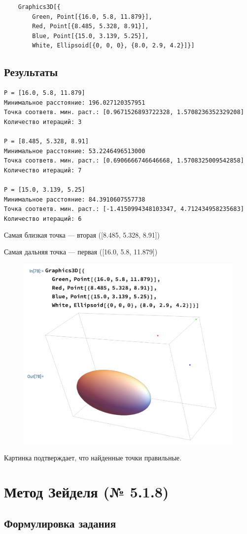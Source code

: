 \documentclass[a4paper,11pt]{article}
\theoremstyle{definition} %
\theoremstyle{remark} %
\begin{document}
\begin{verbatim}
    Graphics3D[{
        Green, Point[{16.0, 5.8, 11.879}],
        Red, Point[{8.485, 5.328, 8.91}], 
        Blue, Point[{15.0, 3.139, 5.25}], 
        White, Ellipsoid[{0, 0, 0}, {8.0, 2.9, 4.2}]}]
\end{verbatim}

\subsection{Результаты}

\begin{verbatim}
P = [16.0, 5.8, 11.879]
Минимальное расстояние: 196.027120357951
Точка соответв. мин. раст.: [0.9671526893722328, 1.5708236352329208]
Количество итераций: 3

P = [8.485, 5.328, 8.91]
Минимальное расстояние: 53.2246496513000
Точка соответв. мин. раст.: [0.6906666746646668, 1.5708325009542858]
Количество итераций: 7

P = [15.0, 3.139, 5.25]
Минимальное расстояние: 84.3910607557738
Точка соответв. мин. раст.: [-1.4150994348103347, 4.712434958235683]
Количество итераций: 6
\end{verbatim}

Самая близкая точка — вторая ([8.485, 5.328, 8.91])

Самая дальняя точка — первая ([16.0, 5.8, 11.879])

\begin{figure}[h]
    \includegraphics[width=0.49\linewidth]{../ellipsoid}
\end{figure}

Картинка подтверждает, что найденные точки правильные.


\section{Метод Зейделя (№ 5.1.8)}

\subsection{Формулировка задания}
\end{document}
